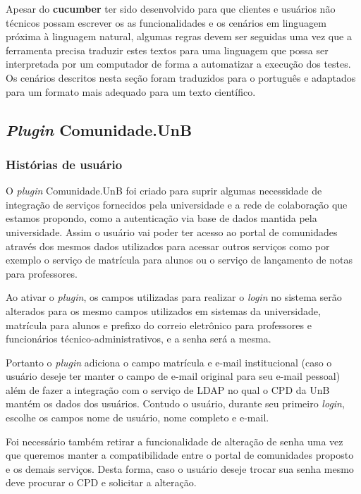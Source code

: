 Apesar do \textbf{cucumber} ter sido desenvolvido para que clientes e usuários
não técnicos possam escrever os as funcionalidades e os cenários em linguagem
próxima à linguagem natural, algumas regras devem ser seguidas uma vez que
a ferramenta precisa traduzir estes textos para uma linguagem que possa ser
interpretada por um computador de forma a automatizar a execução dos testes.
%
Os cenários descritos nesta seção foram traduzidos para o português e
adaptados para um formato mais adequado para um texto científico.


\subsection{\textit{Plugin} Comunidade.UnB}

\subsubsection*{Histórias de usuário}

O \textit{plugin} Comunidade.UnB foi criado para suprir algumas necessidade de
integração de serviços fornecidos pela universidade e a rede de colaboração que
estamos propondo, como a autenticação via base de dados mantida pela universidade.
%
Assim o usuário vai poder ter acesso ao portal de comunidades através dos mesmos
dados utilizados para acessar outros serviços como por exemplo o serviço de
matrícula para alunos ou o serviço de lançamento de notas para professores.

Ao ativar o \textit{plugin}, os campos utilizadas para realizar o \textit{login}
no sistema serão alterados para os mesmo campos utilizados em sistemas da
universidade, matrícula para alunos e prefixo do correio eletrônico para
professores e funcionários técnico-administrativos, e a senha será a mesma.

Portanto o \textit{plugin} adiciona o campo matrícula e e-mail institucional
(caso o usuário deseje ter manter o campo de e-mail original para seu e-mail
pessoal) além de fazer a integração com o serviço de LDAP no qual o CPD da UnB mantém
os dados dos usuários. Contudo o usuário, durante seu primeiro \textit{login},
escolhe os campos nome de usuário, nome completo e e-mail.

Foi necessário também retirar a funcionalidade de alteração de senha uma vez
que queremos manter a compatibilidade entre o portal de comunidades proposto
e os demais serviços. Desta forma, caso o usuário deseje trocar sua senha 
mesmo deve procurar o CPD e solicitar a alteração.

